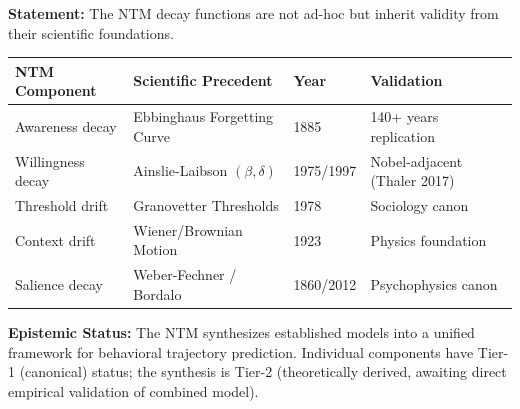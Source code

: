 \documentclass[11pt, a4paper]{article}
\begin{document}
\begin{tcolorbox}[colback=green!5!white, colframe=green!75!black,
    title=\textbf{Theorem NTM-T3: Scientific Validity of Decay Forms}]

\textbf{Statement:} The NTM decay functions are not ad-hoc but inherit validity from their scientific foundations.

\begin{center}
\renewcommand{\arraystretch}{1.3}
\begin{tabular}{@{}llll@{}}
\toprule
\textbf{NTM Component} & \textbf{Scientific Precedent} & \textbf{Year} & \textbf{Validation} \\
\midrule
Awareness decay & Ebbinghaus Forgetting Curve & 1885 & 140+ years replication \\
Willingness decay & Ainslie-Laibson $(\beta,\delta)$ & 1975/1997 & Nobel-adjacent (Thaler 2017) \\
Threshold drift & Granovetter Thresholds & 1978 & Sociology canon \\
Context drift & Wiener/Brownian Motion & 1923 & Physics foundation \\
Salience decay & Weber-Fechner / Bordalo & 1860/2012 & Psychophysics canon \\
\bottomrule
\end{tabular}
\end{center}

\textbf{Epistemic Status:} The NTM synthesizes established models into a unified framework for behavioral trajectory prediction. Individual components have Tier-1 (canonical) status; the synthesis is Tier-2 (theoretically derived, awaiting direct empirical validation of combined model).

\end{tcolorbox}
\end{document}

